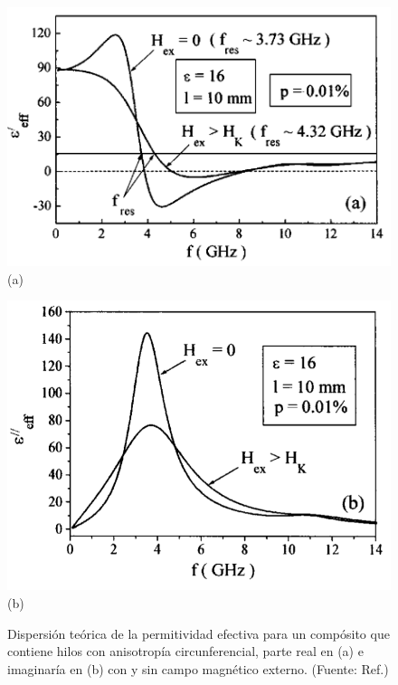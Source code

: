 \documentclass[12pt,letterpaper]{article}
\numberwithin{equation}{section}
\begin{document}
\begin{figure}[H]
	\begin{minipage}{0.5\linewidth}
		\hspace{-20mm}
		\centering\includegraphics[scale=0.31]{Imagenes/efectivo_real.png}\\
		\centering(a)
	\end{minipage}
	\begin{minipage}{0.5\linewidth}
		\centering\includegraphics[scale=0.35]{Imagenes/efectivo_imaginario.png}\\
		\centering(b)
	\end{minipage}
	\caption{Dispersión teórica de la permitividad efectiva para un compósito que contiene hilos con anisotropía circunferencial, parte real en (a) e imaginaría en (b) con y sin campo magnético externo. (Fuente: Ref.\cite{Wire_theory_1})}
	\label{fig:efectivo}
\end{figure}
\end{document}
